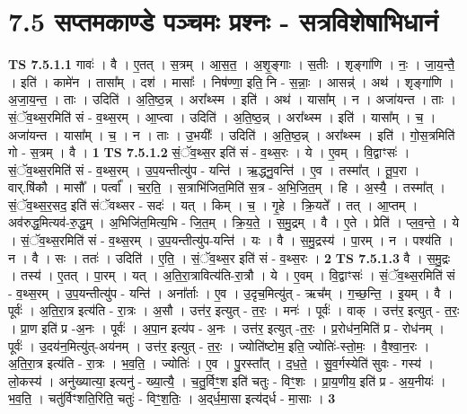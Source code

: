 \documentclass[17pt]{extarticle}
\begin{document}
\section*{ 7.5      सप्तमकाण्डे पञ्चमः प्रश्नः - सत्रविशेषाभिधानं }
                                \textbf{ TS 7.5.1.1} \newline
                  गावः॑ । वै । ए॒तत् । स॒त्रम् । आ॒स॒त॒ । अ॒शृ॒ङ्गाः । स॒तीः । शृङ्गा॑णि । नः॒ । जा॒य॒न्तै॒ । इति॑ । कामे॑न । तासा᳚म् । दश॑ । मासाः᳚ । निष॑ण्णा॒ इति॒ नि - स॒न्नाः॒ । आसन्न्॑ । अथ॑ । शृङ्गा॑णि । अ॒जा॒य॒न्त॒ । ताः । उदिति॑ । अ॒ति॒ष्ठ॒न्न् । अरा᳚थ्स्म । इति॑ । अथ॑ । यासा᳚म् । न । अजा॑यन्त । ताः । सं॒ॅव॒थ्स॒रमिति॑ सं -  व॒थ्स॒रम् । आ॒प्त्वा । उदिति॑ । अ॒ति॒ष्ठ॒न्न् । अरा᳚थ्स्म । इति॑ । यासा᳚म् । च॒ । अजा॑यन्त । यासा᳚म् । च॒ । न । ताः । उ॒भयीः᳚ । उदिति॑ । अ॒ति॒ष्ठ॒न्न् । अरा᳚थ्स्म । इति॑ । गो॒स॒त्रमिति॑ गो - स॒त्रम् । वै । \textbf{  1} \newline
                  \newline
                                \textbf{ TS 7.5.1.2} \newline
                  सं॒ॅव॒थ्स॒र इति॑ सं - व॒थ्स॒रः । ये । ए॒वम् । वि॒द्वाꣳसः॑ । सं॒ॅव॒थ्स॒रमिति॑ सं - व॒थ्स॒रम् । उ॒प॒यन्तीत्यु॑प - यन्ति॑ । ऋ॒द्ध्नु॒वन्ति॑ । ए॒व । तस्मा᳚त् । तू॒प॒रा । वार्.षि॑कौ । मासौ᳚ । पर्त्वा᳚ । च॒र॒ति॒ । स॒त्राभि॑जित॒मिति॑ स॒त्र - अ॒भि॒जि॒त॒म् । हि । अ॒स्यै॒ । तस्मा᳚त् । सं॒ॅव॒थ्स॒र॒सद॒ इति॑ संॅवथ्सर - सदः॑ । यत् । किम् । च॒ । गृ॒हे । क्रि॒यते᳚ । तत् । आ॒प्तम् । अव॑रुद्ध॒मित्यव॑-रु॒द्ध॒म् । अ॒भिजि॑त॒मित्य॒भि - जि॒त॒म् । क्रि॒य॒ते॒ । स॒मु॒द्रम् । वै । ए॒ते । प्रेति॑ । प्ल॒व॒न्ते॒ । ये । सं॒ॅव॒थ्स॒रमिति॑ सं - व॒थ्स॒रम् । उ॒प॒यन्तीत्यु॑प-यन्ति॑ । यः । वै । स॒मु॒द्रस्य॑ । पा॒रम् । न । पश्य॑ति । न । वै । सः । ततः॑ । उदिति॑ । ए॒ति॒ । सं॒ॅव॒थ्स॒र इति॑ सं - व॒थ्स॒रः । \textbf{  2} \newline
                  \newline
                                \textbf{ TS 7.5.1.3} \newline
                  वै । स॒मु॒द्रः । तस्य॑ । ए॒तत् । पा॒रम् । यत् । अ॒ति॒रा॒त्रावित्य॑ति-रा॒त्रौ । ये । ए॒वम् । वि॒द्वाꣳसः॑ । सं॒ॅव॒थ्स॒रमिति॑ सं - व॒थ्स॒रम् । उ॒प॒यन्तीत्यु॑प - यन्ति॑ । अना᳚र्ताः । ए॒व । उ॒दृच॒मित्यु॑त् - ऋच᳚म् । ग॒च्छ॒न्ति॒ । इ॒यम् । वै । पूर्वः॑ । अ॒ति॒रा॒त्र इत्य॑ति - रा॒त्रः । अ॒सौ । उत्त॑र॒ इत्युत् - त॒रः॒ । मनः॑ । पूर्वः॑ । वाक् । उत्त॑र॒ इत्युत् - त॒रः॒ । प्रा॒ण इति॑ प्र -अ॒नः । पूर्वः॑ । अ॒पा॒न इत्य॑प -   अ॒नः । उत्त॑र॒ इत्युत् -त॒रः॒ । प्र॒रोध॑न॒मिति॑ प्र - रोध॑नम् । पूर्वः॑ । उ॒दय॑न॒मित्यु॑त्-अय॑नम् । उत्त॑र॒ इत्युत् - त॒रः॒ । ज्योति॑ष्टोम॒ इति॒ ज्योतिः॑-स्तो॒मः॒ । वै॒श्वा॒न॒रः । अ॒ति॒रा॒त्र इत्य॑ति - रा॒त्रः । भ॒व॒ति॒ । ज्योतिः॑ । ए॒व । पु॒रस्ता᳚त् । द॒ध॒ते॒ । सु॒व॒र्गस्येति॑ सुवः - गस्य॑ । लो॒कस्य॑ । अनु॑ख्यात्या॒ इत्यनु॑ - ख्या॒त्यै॒ । च॒तु॒र्विꣳ॒॒श इति॑ चतुः - विꣳ॒॒शः । प्रा॒य॒णीय॒ इति॑ प्र - अ॒य॒नीयः॑ । भ॒व॒ति॒ । चतु॑र्विꣳशति॒रिति॒ चतुः॑ - विꣳ॒॒श॒तिः॒ । अ॒द्‌र्ध॒मा॒सा इत्य॑द्‌र्ध - मा॒साः । \textbf{  3} \newline
\end{document}
